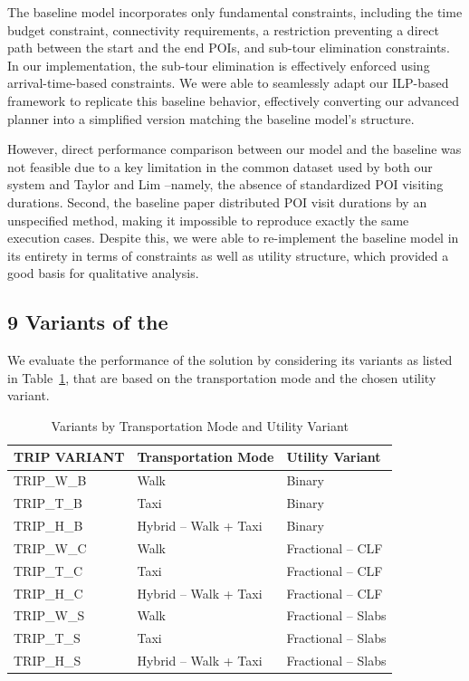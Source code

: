 The baseline model incorporates only fundamental constraints, including the time budget constraint, connectivity requirements, a restriction preventing a direct path between the start and the end POIs, and  sub-tour elimination constraints. In our implementation, the sub-tour elimination is effectively enforced using arrival-time-based constraints. We were able to seamlessly adapt our ILP-based framework to replicate this baseline behavior, effectively converting our advanced planner into a simplified version matching the baseline model's structure.

However, direct performance comparison between our model and the baseline was not feasible due to a key limitation in the common dataset used by both our system and Taylor and Lim \cite{taylor2018tour} --namely, the absence of standardized POI visiting durations. Second, the baseline paper distributed POI visit durations by an unspecified method, making it impossible to reproduce exactly the same execution cases. Despite this, we were able to re-implement the baseline model in its entirety in terms of constraints as well as utility structure, which provided a good basis for qualitative analysis. 

\subsection{9 Variants of the \trip}

We evaluate the performance of the \trip solution by considering its variants as listed in Table~\ref{tab:trip_variants}, that are based on the transportation mode and the chosen utility variant. 
\begin{table}[H]
\centering
\begin{tabular}{|l|l|l|}
\hline
\textbf{TRIP VARIANT} & \textbf{Transportation Mode} & \textbf{Utility Variant} \\
\hline
TRIP\_W\_B & Walk & Binary \\
TRIP\_T\_B & Taxi & Binary \\
TRIP\_H\_B & Hybrid -- Walk + Taxi & Binary \\
TRIP\_W\_C & Walk & Fractional -- CLF \\
TRIP\_T\_C & Taxi & Fractional -- CLF \\
TRIP\_H\_C & Hybrid -- Walk + Taxi & Fractional -- CLF \\
TRIP\_W\_S & Walk & Fractional -- Slabs \\
TRIP\_T\_S & Taxi & Fractional -- Slabs \\
TRIP\_H\_S & Hybrid -- Walk + Taxi & Fractional -- Slabs \\
\hline
\end{tabular}
\caption{\trip Variants by Transportation Mode and Utility Variant}
\label{tab:trip_variants}
\end{table}


